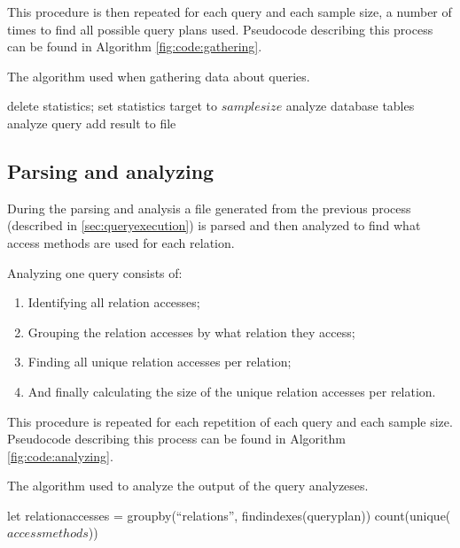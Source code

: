 This procedure is then repeated for each query and each sample size, a number of
times to find all possible query plans used. Pseudocode describing this process
can be found in Algorithm \ref{fig:code:gathering}.

\begin{algorithm}
\caption[Pseudocode for the data gathering]{The algorithm used when
  gathering data about queries.}\label{fig:code:gathering}
\begin{algorithmic}[1]
        \State delete statistics;
        \State set statistics target to $samplesize$
        \State analyze database tables
        \State analyze query
        \State add result to file
      \EndFor
    \EndFor
  \EndFor
\end{algorithmic}
\end{algorithm}

\subsection{Parsing and analyzing} \label{sec:parsing}
During the parsing and analysis a file generated from the previous process
(described in \ref{sec:queryexecution}) is parsed and then analyzed to find what
access methods are used for each relation.

Analyzing one query consists of:
\begin{enumerate}
\item Identifying all relation accesses;
\item Grouping the relation accesses by what relation they access;
\item Finding all unique relation accesses per relation;
\item And finally calculating the size of the unique relation accesses per relation.
\end{enumerate}

This procedure is repeated for each repetition of each query and each sample
size. Pseudocode describing this process can be found in Algorithm \ref{fig:code:analyzing}.

\begin{algorithm}
\caption[Pseudocode for the parsing and analyzing]{The algorithm used to analyze
the output of the query analyzeses.}\label{fig:code:analyzing}
\begin{algorithmic}[1]
    \State let relationaccesses = groupby(``relations'', findindexes(queryplan))
      \State count(unique($accessmethods$))
    \EndFor
  \EndFor
\end{algorithmic}
\end{algorithm}

